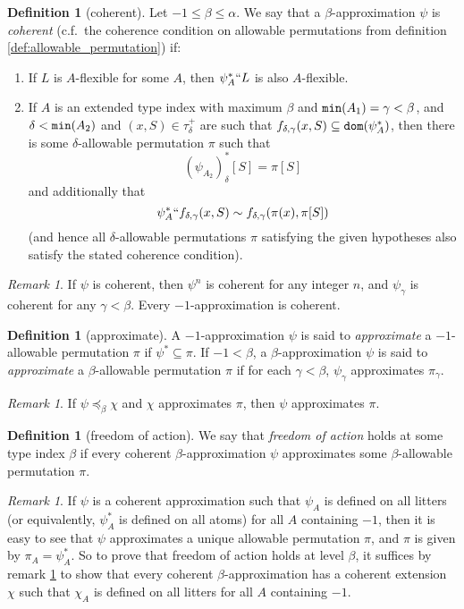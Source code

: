 \documentclass[112pt]{article}
\theoremstyle{definition}
\newtheorem{definition}[theorem]{Definition}
\theoremstyle{remark}
\newtheorem{remark}[theorem]{Remark}
\begin{document}
\begin{definition}[coherent]\label{def:coherent}
  Let $-1 \leq \beta \leq \alpha$.
  We say that a $\beta$-approximation $\psi$ is {\em coherent\/} (c.f.\ the coherence condition on allowable permutations from definition \ref{def:allowable_permutation}) if:
  \begin{enumerate}
    \item If $L$ is $A$-flexible for some $A$, then $\psi_A^*`` L$ is also $A$-flexible.
    \item If $A$ is an extended type index with maximum $\beta$ and ${\tt min}(A_1) = \gamma < \beta$, and $\delta < {\tt min}(A_2)$ and $(x, S) \in \tau_\delta^+$ are such that $f_{\delta,\gamma}(x, S) \subseteq {\tt dom}(\psi_A^*)$, then there is some $\delta$-allowable permutation $\pi$ such that
    $$ (\psi_{A_2})_\delta^*[S] = \pi[S] $$
    and additionally that
    $$ \psi_A^* `` f_{\delta,\gamma}(x, S) \sim f_{\delta,\gamma}(\pi(x), \pi[S]) $$
    (and hence all $\delta$-allowable permutations $\pi$ satisfying the given hypotheses also satisfy the stated coherence condition).
  \end{enumerate}
\end{definition}
\begin{remark}\label{rk:power_deriv_coherent}
  If $\psi$ is coherent, then $\psi^n$ is coherent for any integer $n$, and $\psi_\gamma$ is coherent for any $\gamma < \beta$.
  Every $-1$-approximation is coherent.
\end{remark}
\begin{definition}[approximate]
  A $-1$-approximation $\psi$ is said to {\em approximate\/} a $-1$-allowable permutation $\pi$ if $\psi^* \subseteq \pi$.
  If $-1 < \beta$, a $\beta$-approximation $\psi$ is said to {\em approximate\/} a $\beta$-allowable permutation $\pi$ if for each $\gamma < \beta$, $\psi_\gamma$ approximates $\pi_\gamma$.
\end{definition}
\begin{remark}\label{rk:preceq_approximates}
  If $\psi \preceq_\beta \chi$ and $\chi$ approximates $\pi$, then $\psi$ approximates $\pi$.
\end{remark}
\begin{definition}[freedom of action]\label{def:foa}
  We say that {\em freedom of action\/} holds at some type index $\beta$ if every coherent $\beta$-approximation $\psi$ approximates some $\beta$-allowable permutation $\pi$.
\end{definition}
\begin{remark}\label{rk:foa_suffices}
  If $\psi$ is a coherent approximation such that $\psi_A$ is defined on all litters (or equivalently, $\psi_A^*$ is defined on all atoms) for all $A$ containing $-1$, then it is easy to see that $\psi$ approximates a unique allowable permutation $\pi$, and $\pi$ is given by $\pi_A= \psi_A^*$.
  So to prove that freedom of action holds at level $\beta$, it suffices by remark \ref{rk:preceq_approximates} to show that every coherent $\beta$-approximation has a coherent extension $\chi$ such that $\chi_A$ is defined on all litters for all $A$ containing $-1$.
\end{remark}
\end{document}
